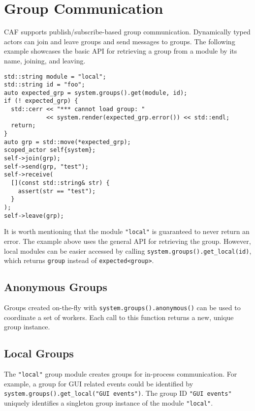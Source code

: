 \section{Group Communication}
\label{groups}

CAF supports publish/subscribe-based group communication. Dynamically typed
actors can join and leave groups and send messages to groups. The following
example showcases the basic API for retrieving a group from a module by its
name, joining, and leaving.

\begin{lstlisting}
std::string module = "local";
std::string id = "foo";
auto expected_grp = system.groups().get(module, id);
if (! expected_grp) {
  std::cerr << "*** cannot load group: "
            << system.render(expected_grp.error()) << std::endl;
  return;
}
auto grp = std::move(*expected_grp);
scoped_actor self{system};
self->join(grp);
self->send(grp, "test");
self->receive(
  [](const std::string& str) {
    assert(str == "test");
  }
);
self->leave(grp);
\end{lstlisting}

It is worth mentioning that the module \lstinline`"local"` is guaranteed to
never return an error. The example above uses the general API for retrieving
the group. However, local modules can be easier accessed by calling
\lstinline`system.groups().get_local(id)`, which returns \lstinline`group`
instead of \lstinline`expected<group>`.

\subsection{Anonymous Groups}
\label{anonymous-group}

Groups created on-the-fly with \lstinline^system.groups().anonymous()^ can be
used to coordinate a set of workers. Each call to this function returns a new,
unique group instance.

\subsection{Local Groups}
\label{local-group}

The \lstinline^"local"^ group module creates groups for in-process
communication. For example, a group for GUI related events could be identified
by \lstinline^system.groups().get_local("GUI events")^. The group ID
\lstinline^"GUI events"^ uniquely identifies a singleton group instance of the
module \lstinline^"local"^.

